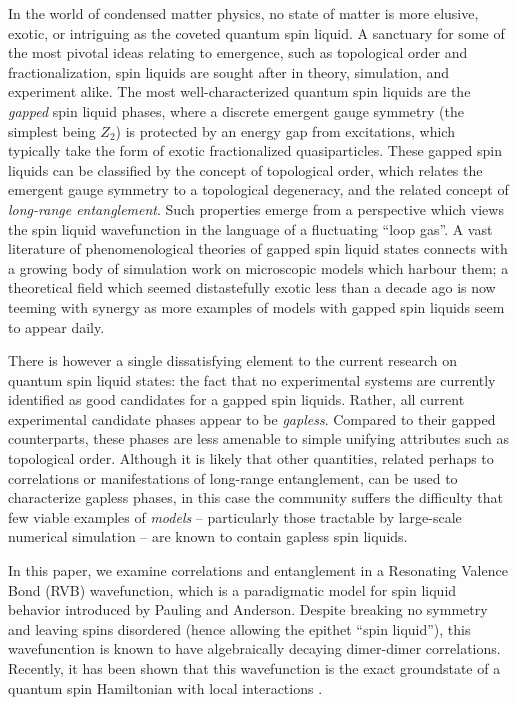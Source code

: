 \documentclass[11pt]{iopart}
\begin{document}
In the world of condensed matter physics, no state of matter is more elusive, exotic, or intriguing as the coveted quantum spin liquid.  A sanctuary for some of the most pivotal ideas relating to emergence, such as topological order and fractionalization, spin liquids are sought after in theory, simulation, and experiment alike.  The most well-characterized quantum spin liquids are the {\it gapped} spin liquid phases, where a discrete emergent gauge symmetry (the simplest being $Z_2$) is protected by an energy gap from excitations, which typically take the form of exotic fractionalized quasiparticles.  These gapped spin liquids can be classified by the concept of topological order, which relates the emergent gauge symmetry to a topological degeneracy, and the related concept of {\it long-range entanglement}.  
Such properties emerge from a perspective which views the spin liquid wavefunction in the language of a fluctuating ``loop gas''.
A vast literature of phenomenological theories of gapped spin liquid states connects with a growing body of simulation work on microscopic models which harbour them; a theoretical field which seemed distastefully exotic less than a decade ago is now teeming with synergy as more examples of models with gapped spin liquids seem to appear daily.

There is however a single dissatisfying element to the current research on quantum spin liquid states: the fact that no experimental systems are currently identified as good candidates for a gapped spin liquids.  Rather, all current experimental candidate phases appear to be {\it gapless}.  Compared to their gapped counterparts, these phases are less amenable to simple unifying attributes such as topological order.  Although it is likely that other quantities, related perhaps to correlations or manifestations of long-range entanglement, can be used to characterize gapless phases, in this case the community suffers the difficulty that few viable examples of {\it models} -- particularly those tractable by large-scale numerical simulation -- are known to contain gapless spin liquids.

In this paper, we examine correlations and entanglement in a Resonating Valence Bond (RVB) wavefunction, which is a paradigmatic model for spin liquid behavior introduced by Pauling and Anderson.  Despite breaking no symmetry and leaving spins disordered (hence allowing the epithet ``spin liquid''), this wavefuncntion is known to have algebraically decaying dimer-dimer correlations.  Recently, it has been shown that this wavefunction is the exact groundstate of a quantum spin Hamiltonian with local interactions \cite{Cano}.
\end{document}
